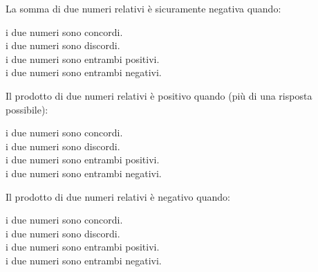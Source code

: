 
\begin{esercizio}
La somma di due numeri relativi è sicuramente negativa quando:
 \begin{multicols}{2}
 \noindent
 \boxA\enspace i due numeri sono concordi.\\
 \boxB\enspace i due numeri sono discordi.\\
 \boxC\enspace i due numeri sono entrambi positivi.\\
 \boxD\enspace i due numeri sono entrambi negativi.
 \end{multicols}
\end{esercizio}

\begin{esercizio}
Il prodotto di due numeri relativi è positivo quando (più di una risposta 
possibile):
 \begin{multicols}{2}
 \noindent
 \boxA\enspace i due numeri sono concordi.\\
 \boxB\enspace i due numeri sono discordi.\\
 \boxC\enspace i due numeri sono entrambi positivi.\\
 \boxD\enspace i due numeri sono entrambi negativi.
 \end{multicols}
\end{esercizio}

\begin{esercizio}
Il prodotto di due numeri relativi è negativo quando:
 \begin{multicols}{2}
 \noindent
 \boxA\enspace i due numeri sono concordi.\\
 \boxB\enspace i due numeri sono discordi.\\
 \boxC\enspace i due numeri sono entrambi positivi.\\
 \boxD\enspace i due numeri sono entrambi negativi.
 \end{multicols}
\end{esercizio}

